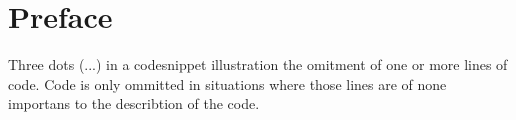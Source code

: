 \chapter*{Preface}
\label{chap:preface}

Three dots (...) in a codesnippet illustration the omitment of one or more lines of code. 
Code is only ommitted in situations where those lines are of none importans to the describtion of the code. 


